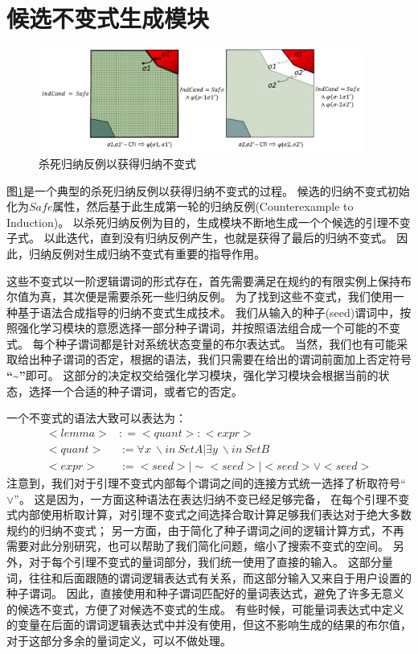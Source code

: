 \section{候选不变式生成模块}

\begin{figure}[h]
    \centering
    \includegraphics[width=0.95\textwidth]{figures/eliminate_cti.pdf}
    \caption{杀死归纳反例以获得归纳不变式}
    \label{fig:eliminate_cti}
\end{figure}

图\ref{fig:eliminate_cti}是一个典型的杀死归纳反例以获得归纳不变式的过程。
候选的归纳不变式初始化为$Safe$属性，然后基于此生成第一轮的归纳反例(Counterexample to Induction)。
以杀死归纳反例为目的，生成模块不断地生成一个个候选的引理不变子式。
以此迭代，直到没有归纳反例产生，也就是获得了最后的归纳不变式。
因此，归纳反例对生成归纳不变式有重要的指导作用。

这些不变式以一阶逻辑谓词的形式存在，首先需要满足在规约的有限实例上保持布尔值为真，其次便是需要杀死一些归纳反例。
为了找到这些不变式，我们使用一种基于语法合成指导的归纳不变式生成技术。
我们从输入的种子(seed)谓词中，按照强化学习模块的意愿选择一部分种子谓词，并按照语法组合成一个可能的不变式。
每个种子谓词都是针对系统状态变量的布尔表达式。
当然，我们也有可能采取给出种子谓词的否定，根据\TLA 的语法，我们只需要在给出的谓词前面加上否定符号 \textbf{“\~{}”}即可。
这部分的决定权交给强化学习模块，强化学习模块会根据当前的状态，选择一个合适的种子谓词，或者它的否定。

一个不变式的语法大致可以表达为：
\begin{align}
    <lemma> &: = <quant>:<expr>   \\
    <quant> &:= \forall x\ \backslash in\ SetA | \exists y\ \backslash in\ SetB \\
    <expr>  &:= <seed>| \sim<seed> | <seed> \lor <seed>
\end{align}
注意到，我们对于引理不变式内部每个谓词之间的连接方式统一选择了析取符号“$\lor$”。
这是因为，一方面这种语法在表达归纳不变已经足够完备\cite{or-complete}，
在每个引理不变式内部使用析取计算，对引理不变式之间选择合取计算足够我们表达对于绝大多数规约的归纳不变式；
另一方面，由于简化了种子谓词之间的逻辑计算方式，不再需要对此分别研究，也可以帮助了我们简化问题，缩小了搜索不变式的空间。
另外，对于每个引理不变式的量词部分，我们统一使用了直接的输入。
这部分量词，往往和后面跟随的谓词逻辑表达式有关系，而这部分输入又来自于用户设置的种子谓词。
因此，直接使用和种子谓词匹配好的量词表达式，避免了许多无意义的候选不变式，方便了对候选不变式的生成。
有些时候，可能量词表达式中定义的变量在后面的谓词逻辑表达式中并没有使用，但这不影响生成的结果的布尔值，对于这部分多余的量词定义，可以不做处理。


